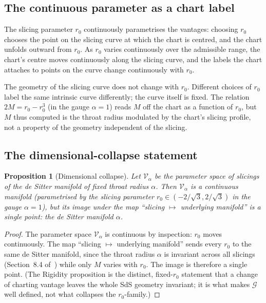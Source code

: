 \documentclass[11pt,a4paper]{article}
\newtheorem{proposition}[theorem]{Proposition}
\theoremstyle{definition}
\begin{document}
\subsection{The continuous parameter as a chart label}\label{sec:label}

The slicing parameter $r_{0}$ continuously parametrises the vantages: choosing $r_{0}$ chooses the point on the slicing curve at which the chart is centred, and the chart unfolds outward from $r_{0}$. As $r_{0}$ varies continuously over the admissible range, the chart's centre moves continuously along the slicing curve, and the labels the chart attaches to points on the curve change continuously with $r_{0}$.

The geometry of the slicing curve does not change with $r_{0}$. Different choices of $r_{0}$ label the same intrinsic curve differently; the curve itself is fixed. The relation $2M=r_{0}-r_{0}^{3}$ (in the gauge $\alpha=1$) reads $M$ off the chart as a function of $r_{0}$, but $M$ thus computed is the throat radius modulated by the chart's slicing profile, not a property of the geometry independent of the slicing.

\subsection{The dimensional-collapse statement}\label{sec:dim-collapse}

\begin{proposition}[Dimensional collapse]\label{prop:dim-collapse}
Let $\mathcal{V}_{\alpha}$ be the parameter space of slicings of the de Sitter manifold of fixed throat radius $\alpha$. Then $\mathcal{V}_{\alpha}$ is a continuous manifold (parametrised by the slicing parameter $r_{0}\in(-2/\sqrt{3},2/\sqrt{3})$ in the gauge $\alpha=1$), but its image under the map ``slicing $\mapsto$ underlying manifold'' is a single point: the de Sitter manifold $\alpha$.
\end{proposition}

\begin{proof}
The parameter space $\mathcal{V}_{\alpha}$ is continuous by inspection: $r_{0}$ moves continuously. The map ``slicing $\mapsto$ underlying manifold'' sends every $r_{0}$ to the same de Sitter manifold, since the throat radius $\alpha$ is invariant across all slicings (Section~8.4 of~\cite{JanzenSlicing}) while only $M$ varies with $r_{0}$. The image is therefore a single point. (The Rigidity proposition is the distinct, fixed-$r_{0}$ statement that a change of charting vantage leaves the whole SdS geometry invariant; it is what makes $\mathcal{G}$ well defined, not what collapses the $r_{0}$-family.)
\end{proof}
\end{document}
